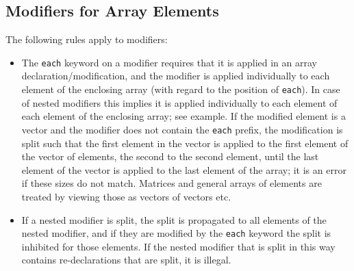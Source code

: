 \subsection{Modifiers for Array Elements}\label{modifiers-for-array-elements}

The following rules apply to modifiers:
\begin{itemize}
\item
  The \lstinline!each! keyword on a modifier requires that it is applied in an array declaration/modification, and the modifier is applied individually to each element of the enclosing array (with regard to the position of \lstinline!each!).
  In case of nested modifiers this implies it is applied individually to each element of each element of the enclosing array; see example.
  If the modified element is a vector and the modifier does not contain the \lstinline!each! prefix, the modification is split such that the first element in the vector is applied to the first element of the vector of elements, the second to the second element, until the last element of the vector is applied to the last element of the array; it is an error if these sizes do not match.
  Matrices and general arrays of elements are treated by viewing those as vectors of vectors etc.
\item
  If a nested modifier is split, the split is propagated to all elements of the nested modifier, and if they are modified by the \lstinline!each! keyword the split is inhibited for those elements.
  If the nested modifier that is split in this way contains re-declarations that are split, it is illegal.
\end{itemize}

